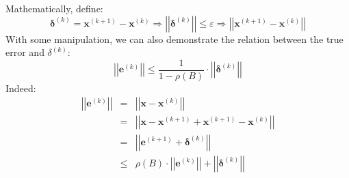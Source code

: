 \begin{itemize}
    Mathematically, define:
    \begin{equation*}
        \mathbf{\delta}^{\left(k\right)} = \mathbf{x}^{\left(k+1\right)} - \mathbf{x}^{\left(k\right)} \Longrightarrow \left|\left|\mathbf{\delta}^{\left(k\right)}\right|\right| \le \varepsilon \Longrightarrow \left|\left|\mathbf{x}^{\left(k+1\right)} - \mathbf{x}^{\left(k\right)}\right|\right|
    \end{equation*}
    With some manipulation, we can also demonstrate the relation between the true error and $\delta^{\left(k\right)}$:
    \begin{equation*}
        \left|\left|\mathbf{e}^{\left(k\right)}\right|\right| \le \dfrac{1}{1 - \rho\left(B\right)} \cdot \left|\left|\mathbf{\delta}^{\left(k\right)}\right|\right|
    \end{equation*}
    Indeed:
    \begin{equation*}
        \begin{array}{rcl}
            \left|\left|\mathbf{e}^{\left(k\right)}\right|\right| &=& \left|\left|\mathbf{x}-\mathbf{x}^{\left(k\right)}\right|\right| \\ [.5em]
            &=& \left|\left|\mathbf{x}-\mathbf{x}^{\left(k+1\right)} + \mathbf{x}^{\left(k+1\right)} - \mathbf{x}^{\left(k\right)}\right|\right| \\ [.5em]
            &=& \left|\left|\mathbf{e}^{\left(k+1\right)} + \mathbf{\delta}^{\left(k\right)}\right|\right| \\ [.5em]
            &\le& \rho\left(B\right) \cdot \left|\left|\mathbf{e}^{\left(k\right)}\right|\right| + \left|\left|\mathbf{\delta}^{\left(k\right)}\right|\right|
        \end{array}
    \end{equation*}
\end{itemize}